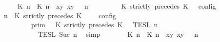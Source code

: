 \begin{isabellebody}
\ \ \ \ {\isacharequal}\ {\isasymlbrakk}\ {\isacharparenleft}{\isacharparenleft}{\isasymlceil}{\isacharhash}\isactrlsup {\isasymle}\ K\ n{\isacharcomma}\ {\isacharhash}\isactrlsup {\isacharless}\ K\ n{\isasymrceil}\ {\isasymin}\ {\isacharparenleft}{\isasymlambda}{\isacharparenleft}x{\isacharcomma}y{\isacharparenright}{\isachardot}\ x{\isasymle}y{\isacharparenright}{\isacharparenright}\ {\isacharhash}\ {\isasymGamma}{\isacharparenright}{\isacharcomma}\ n\isanewline
\ \ \ \ \ \ {\isasymturnstile}\ {\isasymPsi}\ {\isasymtriangleright}\ {\isacharparenleft}{\isacharparenleft}K\ strictly\ precedes\ K\ {\isacharhash}\ {\isasymPhi}{\isacharparenright}\ {\isasymrbrakk}\isactrlsub c\isactrlsub o\isactrlsub n\isactrlsub f\isactrlsub i\isactrlsub g{\isacartoucheclose}\isanewline
%
\isadelimproof
%
\endisadelimproof
%
\isatagproof
{}\isamarkupfalse%
\ {\isacharminus}\isanewline
\ \ \isamarkupfalse%
\ {\isacartoucheopen}{\isasymlbrakk}\ {\isasymGamma}{\isacharcomma}\ n\ {\isasymturnstile}\ {\isacharparenleft}K\ strictly\ precedes\ K\ {\isacharhash}\ {\isasymPsi}\ {\isasymtriangleright}\ {\isasymPhi}\ {\isasymrbrakk}\isactrlsub c\isactrlsub o\isactrlsub n\isactrlsub f\isactrlsub i\isactrlsub g\isanewline
\ \ \ \ \ \ \ \ {\isacharequal}\ {\isasymlbrakk}{\isasymlbrakk}\ {\isasymGamma}\ {\isasymrbrakk}{\isasymrbrakk}\isactrlsub p\isactrlsub r\isactrlsub i\isactrlsub m\ {\isasyminter}\ {\isasymlbrakk}{\isasymlbrakk}\ {\isacharparenleft}K\ strictly\ precedes\ K\ {\isacharhash}\ {\isasymPsi}\ {\isasymrbrakk}{\isasymrbrakk}\isactrlsub T\isactrlsub E\isactrlsub S\isactrlsub L\isactrlbsup {\isasymge}\ n\isactrlesup \isanewline
\ \ \ \ \ \ \ \ \ \ {\isasyminter}\ {\isasymlbrakk}{\isasymlbrakk}\ {\isasymPhi}\ {\isasymrbrakk}{\isasymrbrakk}\isactrlsub T\isactrlsub E\isactrlsub S\isactrlsub L\isactrlbsup {\isasymge}\ Suc\ n\isactrlesup {\isacartoucheclose}\ \isamarkupfalse%
\ simp\isanewline
\ \ \isamarkupfalse%
\ \isamarkupfalse%
\ {\isacartoucheopen}{\isasymlbrakk}\ {\isacharparenleft}{\isacharparenleft}{\isasymlceil}{\isacharhash}\isactrlsup {\isasymle}\ K\ n{\isacharcomma}\ {\isacharhash}\isactrlsup {\isacharless}\ K\ n{\isasymrceil}\ {\isasymin}\ {\isacharparenleft}{\isasymlambda}{\isacharparenleft}x{\isacharcomma}y{\isacharparenright}{\isachardot}\ x{\isasymle}y{\isacharparenright}{\isacharparenright}\ {\isacharhash}\ {\isasymGamma}{\isacharparenright}{\isacharcomma}\ n\isanewline

\end{isabellebody}
